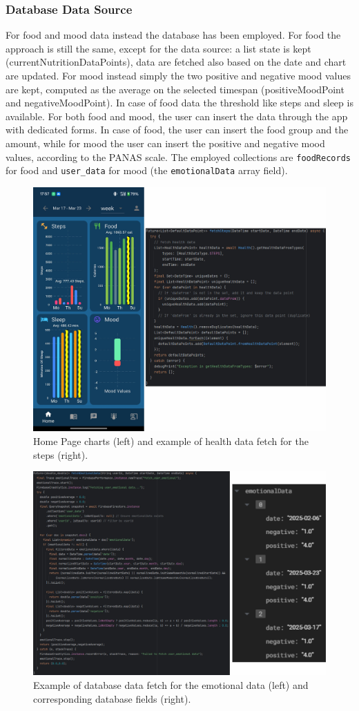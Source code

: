 \subsubsection{Database Data Source}
For food and mood data instead the database has been employed. For food the approach is still the same, except for the data source: a list state is kept (currentNutritionDataPoints), data are fetched also based on the date and chart are updated. For mood instead simply the two positive and negative mood values are kept, computed as the average on the selected timespan (positiveMoodPoint and negativeMoodPoint). In case of food data the threshold like steps and sleep is available. For both food and mood, the user can insert the data through the app with dedicated forms. In case of food, the user can insert the food group and the amount, while for mood the user can insert the positive and negative mood values, according to the PANAS scale. The employed collections are \texttt{foodRecords} for food and \texttt{user\_data} for mood (the \texttt{emotionalData} array field).
\clearpage
\begin{figure}
    \centering
    \includegraphics[width=0.7\linewidth]{./images/homeFetch.jpg}
    \caption{Home Page charts (left) and example of health data fetch for the steps (right).}
\end{figure}

\begin{figure}
    \centering
    \includegraphics[width=0.7\linewidth]{./images/emotionalFetch.jpg}
    \caption{Example of database data fetch for the emotional data (left) and corresponding database fields (right).}
\end{figure}

